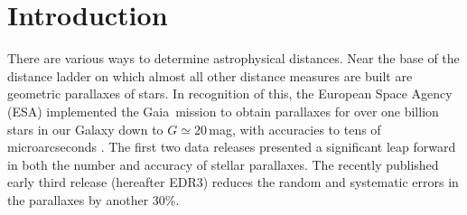 \documentclass[twocolumn]{aastex62}
\providecommand{\gaia}{Gaia}
\providecommand{\release}{EDR3}
\providecommand{\gmag}{\ensuremath{G}}
\begin{document}



\section{Introduction}\label{sec:introduction}

There are various ways to determine astrophysical distances. Near the base of the distance ladder on which almost all other distance measures are built are geometric parallaxes of stars. In recognition of this, the European Space Agency (ESA) implemented the \gaia\ mission to obtain parallaxes for over one billion stars in our Galaxy down to $\gmag \simeq 20$\,mag,
with accuracies to tens of microarcseconds \citep{2016A&A...595A...1G}. The first two data releases \citep{2016A&A...595A...2G, 2018A&A...616A...1G} presented a significant leap forward in both the number and accuracy of stellar parallaxes. The recently published early third release \citep{gedr3_release} (hereafter \release) reduces the random and systematic errors in the parallaxes by another 30\%.
\end{document}
